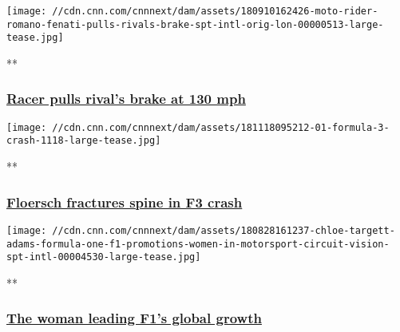 \href{/videos/sports/2018/09/10/moto-rider-romano-fenati-pulls-rivals-brake-spt-intl-orig-lon.cnn}{}

\texttt{[image: //cdn.cnn.com/cnnnext/dam/assets/180910162426-moto-rider-romano-fenati-pulls-rivals-brake-spt-intl-orig-lon-00000513-large-tease.jpg]}

**

\hypertarget{racer-pulls-rivals-brake-at-130-mph}{%
\subsubsection{\texorpdfstring{\href{/videos/sports/2018/09/10/moto-rider-romano-fenati-pulls-rivals-brake-spt-intl-orig-lon.cnn}{Racer
pulls rival's brake at 130
mph}}{Racer pulls rival's brake at 130 mph}}\label{racer-pulls-rivals-brake-at-130-mph}}

\href{/videos/sports/2018/11/19/sophia-floersch-formula-three-crash-macau-grand-prix-grm-spt-intl.cnn}{}

\texttt{[image: //cdn.cnn.com/cnnnext/dam/assets/181118095212-01-formula-3-crash-1118-large-tease.jpg]}

**

\hypertarget{floersch-fractures-spine-in-f3-crash}{%
\subsubsection{\texorpdfstring{\href{/videos/sports/2018/11/19/sophia-floersch-formula-three-crash-macau-grand-prix-grm-spt-intl.cnn}{Floersch
fractures spine in F3
crash}}{Floersch fractures spine in F3 crash}}\label{floersch-fractures-spine-in-f3-crash}}

\href{/videos/sports/2018/08/28/chloe-targett-adams-formula-one-f1-promotions-women-in-motorsport-circuit-vision-spt-intl.cnn}{}

\texttt{[image: //cdn.cnn.com/cnnnext/dam/assets/180828161237-chloe-targett-adams-formula-one-f1-promotions-women-in-motorsport-circuit-vision-spt-intl-00004530-large-tease.jpg]}

**

\hypertarget{the-woman-leading-f1s-global-growth}{%
\subsubsection{\texorpdfstring{\href{/videos/sports/2018/08/28/chloe-targett-adams-formula-one-f1-promotions-women-in-motorsport-circuit-vision-spt-intl.cnn}{The
woman leading F1's global
growth}}{The woman leading F1's global growth}}\label{the-woman-leading-f1s-global-growth}}

